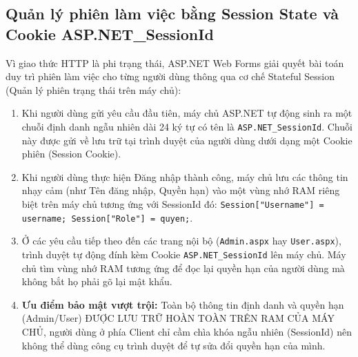 \documentclass[12pt,a4paper]{report}
\begin{document}
\subsection{Quản lý phiên làm việc bằng Session State và Cookie ASP.NET\_SessionId}
Vì giao thức HTTP là phi trạng thái, ASP.NET Web Forms giải quyết bài toán duy trì phiên làm việc cho từng người dùng thông qua cơ chế Stateful Session (Quản lý phiên trạng thái trên máy chủ):
\begin{enumerate}
    \item Khi người dùng gửi yêu cầu đầu tiên, máy chủ ASP.NET tự động sinh ra một chuỗi định danh ngẫu nhiên dài 24 ký tự có tên là \texttt{ASP.NET\_SessionId}. Chuỗi này được gửi về lưu trữ tại trình duyệt của người dùng dưới dạng một Cookie phiên (Session Cookie).
    \item Khi người dùng thực hiện Đăng nhập thành công, máy chủ lưu các thông tin nhạy cảm (như Tên đăng nhập, Quyền hạn) vào một vùng nhớ RAM riêng biệt trên máy chủ tương ứng với SessionId đó: \texttt{Session["Username"] = username; Session["Role"] = quyen;}.
    \item Ở các yêu cầu tiếp theo đến các trang nội bộ (\texttt{Admin.aspx} hay \texttt{User.aspx}), trình duyệt tự động đính kèm Cookie \texttt{ASP.NET\_SessionId} lên máy chủ. Máy chủ tìm vùng nhớ RAM tương ứng để đọc lại quyền hạn của người dùng mà không bắt họ phải gõ lại mật khẩu.
    \item \textbf{Ưu điểm bảo mật vượt trội:} Toàn bộ thông tin định danh và quyền hạn (Admin/User) ĐƯỢC LƯU TRỮ HOÀN TOÀN TRÊN RAM CỦA MÁY CHỦ, người dùng ở phía Client chỉ cầm chìa khóa ngẫu nhiên (SessionId) nên không thể dùng công cụ trình duyệt để tự sửa đổi quyền hạn của mình.
\end{enumerate}
\end{document}
